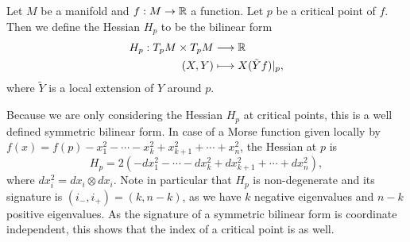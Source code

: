 \begin{definition}
    Let $M$ be a manifold and $f: M \to  \mathbb{R}$ a function.
    Let $p$ be a critical point of $f$.
    Then we define the Hessian $H_p$ to be the bilinear form
    \begin{align*}
        H_p: T_pM \times T_pM &\longrightarrow  \mathbb{R}\\
        (X, Y) &\longmapsto X (\tilde{Y} f)|_p
    ,\end{align*} 
    where $\tilde{Y}$ is a local extension of $Y$ around $p$.
\end{definition}
Because we are only considering the Hessian $H_p$ at critical points, this is a well defined symmetric bilinear form. 
In case of a Morse function given locally by $f(x) = f(p) - x_1^2 - \cdots - x_k^2 + x_{k+1}^2 + \cdots + x_n^2$, the Hessian at $p$ is 
\[
    H_p = 2(- dx_1^2 - \cdots - dx_k^2 + dx_{k+1}^2  + \cdots + dx_n^2)
,\] 
where $dx_i^2 = dx_i \otimes dx_i$.
Note in particular that $H_p$ is non-degenerate and its signature is $(i_-, i_{+}) = (k, n-k)$, as we have $k$ negative eigenvalues and $n-k$ positive eigenvalues.
As the signature of a symmetric bilinear form is coordinate independent, this shows that the index of a critical point is as well.


